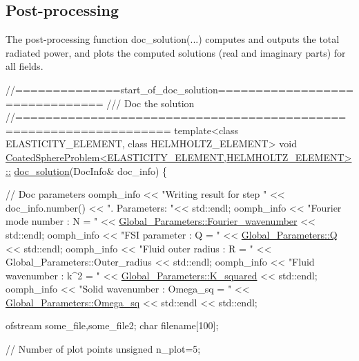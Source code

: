  

\hypertarget{index_doc}{}\subsection{Post-\/processing}\label{index_doc}
The post-\/processing function {\ttfamily doc\+\_\+solution}(...) computes and outputs the total radiated power, and plots the computed solutions (real and imaginary parts) for all fields.

 
\begin{DoxyCodeInclude}
\textcolor{comment}{//==============start\_of\_doc\_solution===============================}
\textcolor{comment}{/// Doc the solution}
\textcolor{comment}{}\textcolor{comment}{//==================================================================}
\textcolor{keyword}{template}<\textcolor{keyword}{class} ELASTICITY\_ELEMENT, \textcolor{keyword}{class} HELMHOLTZ\_ELEMENT>
\textcolor{keywordtype}{void} \hyperlink{classCoatedSphereProblem_aaeade2a110160c002b2b45954a5a0edc}{CoatedSphereProblem<ELASTICITY\_ELEMENT,HELMHOLTZ\_ELEMENT>::}
\hyperlink{classCoatedSphereProblem_aaeade2a110160c002b2b45954a5a0edc}{doc\_solution}(DocInfo& doc\_info)
\{

 \textcolor{comment}{// Doc parameters}
 oomph\_info << \textcolor{stringliteral}{"Writing result for step "} << doc\_info.number() 
            << \textcolor{stringliteral}{". Parameters: "}<< std::endl;
 oomph\_info << \textcolor{stringliteral}{"Fourier mode number : N = "}
            << \hyperlink{namespaceGlobal__Parameters_ae1198385d90f52c4ed921520ae43a9e7}{Global\_Parameters::Fourier\_wavenumber} << std::endl;
 oomph\_info << \textcolor{stringliteral}{"FSI parameter : Q = "} << \hyperlink{namespaceGlobal__Parameters_a7814fddf663e56168174a42d2cd6b4c1}{Global\_Parameters::Q} << std::endl;
 oomph\_info << \textcolor{stringliteral}{"Fluid outer radius : R = "} << Global\_Parameters::Outer\_radius
            << std::endl;
 oomph\_info << \textcolor{stringliteral}{"Fluid wavenumber : k^2 = "} << \hyperlink{namespaceGlobal__Parameters_a91a3fa265abaf9e724c668ee800ffb29}{Global\_Parameters::K\_squared}
            << std::endl;
 oomph\_info << \textcolor{stringliteral}{"Solid wavenumber : Omega\_sq = "} << \hyperlink{namespaceGlobal__Parameters_a91314f7f1cc80c43543948568f50f405}{Global\_Parameters::Omega\_sq} 
            << std::endl << std::endl; 


 ofstream some\_file,some\_file2;
 \textcolor{keywordtype}{char} filename[100];

 \textcolor{comment}{// Number of plot points}
 \textcolor{keywordtype}{unsigned} n\_plot=5; 


\end{DoxyCodeInclude}
